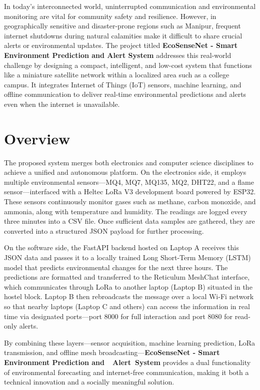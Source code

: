 
In today’s interconnected world, uninterrupted communication and environmental monitoring are vital for community safety and resilience. However, in geographically sensitive and disaster-prone regions such as Manipur, frequent internet shutdowns during natural calamities make it difficult to share crucial alerts or environmental updates. The project titled \textbf{EcoSenseNet - Smart Environment Prediction and Alert System} addresses this real-world challenge by designing a compact, intelligent, and low-cost system that functions like a miniature satellite network within a localized area such as a college campus. It integrates Internet of Things (IoT) sensors, machine learning, and offline communication to deliver real-time environmental predictions and alerts even when the internet is unavailable.

\section{Overview}

The proposed system merges both electronics and computer science disciplines to achieve a unified and autonomous platform. On the electronics side, it employs multiple environmental sensors—MQ4, MQ7, MQ135, MQ2, DHT22, and a flame sensor—interfaced with a Heltec LoRa V3 development board powered by ESP32. These sensors continuously monitor gases such as methane, carbon monoxide, and ammonia, along with temperature and humidity. The readings are logged every three minutes into a CSV file. Once sufficient data samples are gathered, they are converted into a structured JSON payload for further processing.

On the software side, the FastAPI backend hosted on Laptop A receives this JSON data and passes it to a locally trained Long Short-Term Memory (LSTM) model that predicts environmental changes for the next three hours. The predictions are formatted and transferred to the Reticulum MeshChat interface, which communicates through LoRa to another laptop (Laptop B) situated in the hostel block. Laptop B then rebroadcasts the message over a local Wi-Fi network so that nearby laptops (Laptop C and others) can access the information in real time via designated ports—port 8000 for full interaction and port 8080 for read-only alerts.

By combining these layers—sensor acquisition, machine learning prediction, LoRa transmission, and offline mesh broadcasting—\textbf{EcoSenseNet - Smart Environment Prediction and  Alert System} provides a dual functionality of environmental forecasting and internet-free communication, making it both a technical innovation and a socially meaningful solution.

